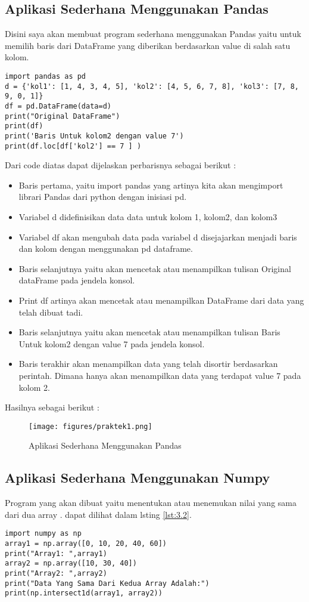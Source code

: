 \subsection{Aplikasi Sederhana Menggunakan Pandas}
Disini saya akan membuat program sederhana menggunakan Pandas yaitu untuk memilih baris dari DataFrame yang diberikan berdasarkan value di salah satu kolom.
\begin{lstlisting}[caption=Code Program Sederhana Pandas,label={lst:3.1}]
import pandas as pd
d = {'kol1': [1, 4, 3, 4, 5], 'kol2': [4, 5, 6, 7, 8], 'kol3': [7, 8, 9, 0, 1]}
df = pd.DataFrame(data=d)
print("Original DataFrame")
print(df)
print('Baris Untuk kolom2 dengan value 7')
print(df.loc[df['kol2'] == 7 ] )
\end{lstlisting}
Dari code diatas dapat dijelaskan perbarisnya sebagai berikut :
\begin{itemize}
\item
Baris pertama, yaitu import pandas yang artinya kita akan mengimport librari Pandas dari python dengan inisiasi pd.
\item
Variabel d didefinisikan data data untuk kolom 1, kolom2, dan kolom3 
\item
Variabel df akan mengubah data pada variabel d disejajarkan menjadi baris dan kolom dengan menggunakan pd dataframe.
\item
Baris selanjutnya yaitu akan mencetak atau menampilkan tulisan Original dataFrame pada jendela konsol.
\item
Print df artinya akan mencetak atau menampilkan DataFrame dari data yang telah dibuat tadi.
\item
Baris selanjutnya yaitu akan mencetak atau menampilkan tulisan Baris Untuk kolom2 dengan value 7 pada jendela konsol.
\item
Baris terakhir akan menampilkan data yang telah disortir berdasarkan perintah. Dimana hanya akan menampilkan data yang terdapat value 7 pada kolom 2.
\end{itemize}

Hasilnya sebagai berikut :
\begin{figure}[ht]
\centering
\texttt{[image: figures/praktek1.png]}
\caption{Aplikasi Sederhana Menggunakan Pandas}
\label{Praktek}
\end{figure}

\subsection{ Aplikasi Sederhana Menggunakan Numpy}
Program yang akan dibuat yaitu menentukan atau menemukan  nilai yang sama dari dua array . dapat dilihat dalam lsting \ref{lst:3.2}.
\begin{lstlisting}[caption=Code Program Sederhana Numpy,label={lst:3.2}]
import numpy as np
array1 = np.array([0, 10, 20, 40, 60])
print("Array1: ",array1)
array2 = np.array([10, 30, 40])
print("Array2: ",array2)
print("Data Yang Sama Dari Kedua Array Adalah:")
print(np.intersect1d(array1, array2))
\end{lstlisting}

